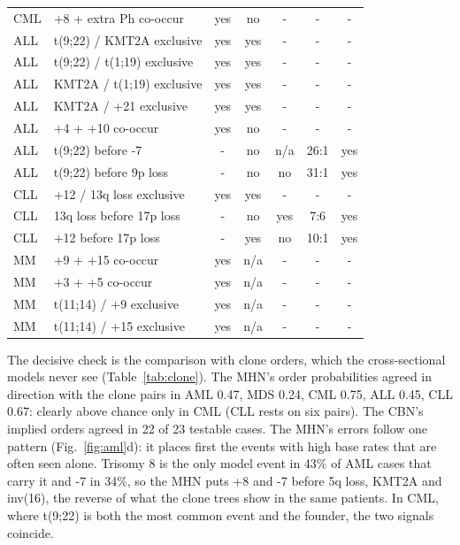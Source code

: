 \documentclass[conference]{IEEEtran}
\begin{document}
\begin{table}[!t]
\begin{tabular}{llccccc}
CML & +8 + extra Ph co-occur & yes & no & - & - & - \\
ALL & t(9;22) / KMT2A exclusive & yes & yes & - & - & - \\
ALL & t(9;22) / t(1;19) exclusive & yes & yes & - & - & - \\
ALL & KMT2A / t(1;19) exclusive & yes & yes & - & - & - \\
ALL & KMT2A / +21 exclusive & yes & yes & - & - & - \\
ALL & +4 + +10 co-occur & yes & no & - & - & - \\
ALL & t(9;22) before -7 & - & no & n/a & 26:1 & yes \\
ALL & t(9;22) before 9p loss & - & no & no & 31:1 & yes \\
CLL & +12 / 13q loss exclusive & yes & yes & - & - & - \\
CLL & 13q loss before 17p loss & - & no & yes & 7:6 & yes \\
CLL & +12 before 17p loss & - & yes & no & 10:1 & yes \\
MM & +9 + +15 co-occur & yes & n/a & - & - & - \\
MM & +3 + +5 co-occur & yes & n/a & - & - & - \\
MM & t(11;14) / +9 exclusive & yes & n/a & - & - & - \\
MM & t(11;14) / +15 exclusive & yes & n/a & - & - & - \\
\bottomrule
\end{tabular}
\end{table}
The decisive check is the comparison with clone orders, which the cross-sectional models never see (Table~\ref{tab:clone}). The MHN's order probabilities agreed in direction with the clone pairs in AML 0.47, MDS 0.24, CML 0.75, ALL 0.45, CLL 0.67: clearly above chance only in CML (CLL rests on six pairs). The CBN's implied orders agreed in 22 of 23 testable cases. The MHN's errors follow one pattern (Fig.~\ref{fig:aml}d): it places first the events with high base rates that are often seen alone. Trisomy 8 is the only model event in 43\% of AML cases that carry it and -7 in 34\%, so the MHN puts +8 and -7 before 5q loss, KMT2A and inv(16), the reverse of what the clone trees show in the same patients. In CML, where t(9;22) is both the most common event and the founder, the two signals coincide.
\end{document}
